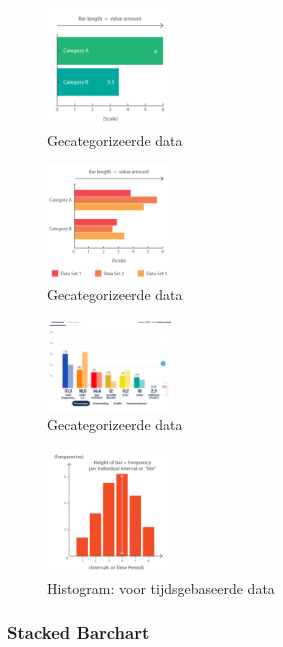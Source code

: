 \documentclass{article}
\begin{document}
\begin{figure}[H]
    \centering
    \includegraphics[width=0.3\textwidth]{dv-barchart1.png}
    \caption{Gecategorizeerde data}
\end{figure}
\begin{figure}[H]
    \centering
    \includegraphics[width=0.3\textwidth]{dv-barchart2.png}
    \caption{Gecategorizeerde data}
\end{figure}
\begin{figure}[H]
    \centering
    \includegraphics[width=0.3\textwidth]{dv-barchart3.png}
    \caption{Gecategorizeerde data}
\end{figure}
\begin{figure}[H]
    \centering
    \includegraphics[width=0.3\textwidth]{dv-barchart4.png}
    \caption{Histogram: voor tijdsgebaseerde data}
\end{figure}

\subsubsection{Stacked Barchart}
\end{document}
